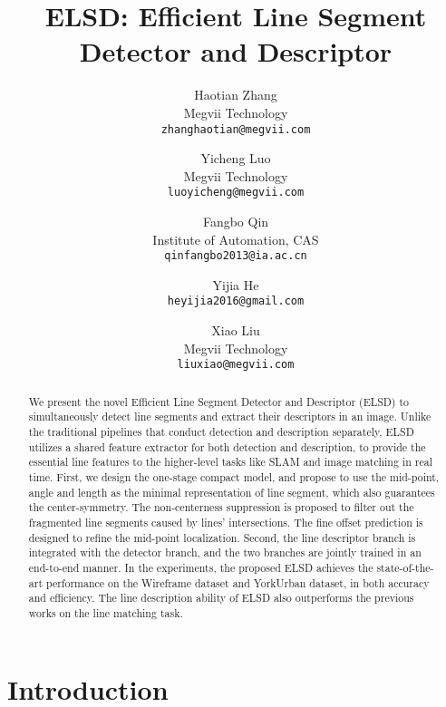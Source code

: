 \documentclass[10pt,twocolumn,letterpaper]{article}
\begin{document}
\title{ELSD: Efficient Line Segment Detector and Descriptor}

\author{Haotian Zhang\\
Megvii Technology\\
{\tt\small zhanghaotian@megvii.com}
\and
Yicheng Luo\\
Megvii Technology\\
{\tt\small luoyicheng@megvii.com}
\and
Fangbo Qin\\
Institute of Automation, CAS\\
{\tt\small qinfangbo2013@ia.ac.cn}
\and
Yijia He\\
{\tt\small heyijia2016@gmail.com}
\and
Xiao Liu\\
Megvii Technology\\
{\tt\small liuxiao@megvii.com}
}

\maketitle
\ificcvfinal\thispagestyle{empty}\fi

\begin{abstract}
   We present the novel Efficient Line Segment Detector and Descriptor (ELSD) to simultaneously detect line segments and extract their descriptors in an image. Unlike the traditional pipelines that conduct detection and description separately, ELSD utilizes a shared feature extractor for both detection and description, to provide the essential line features to the higher-level tasks like SLAM and image matching in real time. First, we design the one-stage compact model, and propose to use the mid-point, angle and length as the minimal representation of line segment, which also guarantees the center-symmetry. The non-centerness suppression is proposed to filter out the fragmented line segments caused by lines' intersections. The fine offset prediction is designed to refine the mid-point localization. Second, the line descriptor branch is integrated with the detector branch, and the two branches are jointly trained in an end-to-end manner. In the experiments, the proposed ELSD achieves the state-of-the-art performance on the Wireframe dataset and YorkUrban dataset, in both accuracy and efficiency. The line description ability of ELSD also outperforms the previous works on the line matching task.
\end{abstract}

\section{Introduction}
\end{document}
